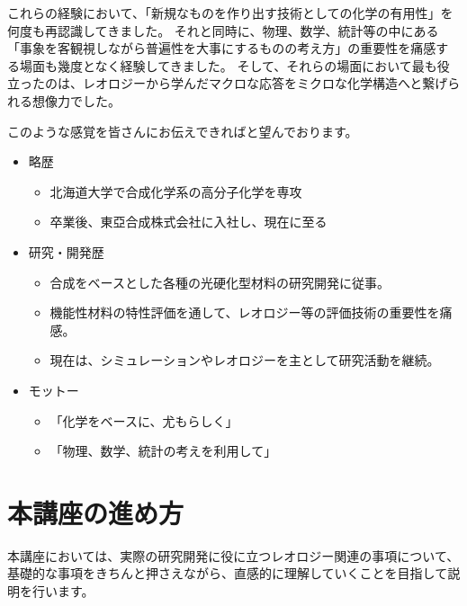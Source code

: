 これらの経験において、「新規なものを作り出す技術としての化学の有用性」を何度も再認識してきました。
それと同時に、物理、数学、統計等の中にある「事象を客観視しながら普遍性を大事にするものの考え方」の重要性を痛感する場面も幾度となく経験してきました。
そして、それらの場面において最も役立ったのは、レオロジーから学んだマクロな応答をミクロな化学構造へと繋げられる想像力でした。

このような感覚を皆さんにお伝えできればと望んでおります。

\begin{screen}
	\begin{itemize}
		\item 略歴
        \begin{itemize}
            \item 北海道大学で合成化学系の高分子化学を専攻
			\item 卒業後、東亞合成株式会社に入社し、現在に至る
		\end{itemize}
		\item  研究・開発歴
		\begin{itemize}
			\item 合成をベースとした各種の光硬化型材料の研究開発に従事。
			\item 機能性材料の特性評価を通して、レオロジー等の評価技術の重要性を痛感。
			\item 現在は、シミュレーションやレオロジーを主として研究活動を継続。
		\end{itemize}
		\item モットー
		\begin{itemize}
            \item 「化学をベースに、尤もらしく」
			\item 「物理、数学、統計の考えを利用して」
		\end{itemize}
	\end{itemize}
\end{screen}

\section*{本講座の進め方}

本講座においては、実際の研究開発に役に立つレオロジー関連の事項について、基礎的な事項をきちんと押さえながら、直感的に理解していくことを目指して説明を行います。

